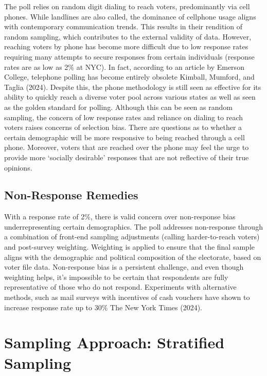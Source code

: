\documentclass[
  letterpaper,
  DIV=11,
  numbers=noendperiod]{scrartcl}
\begin{document}
The poll relies on random digit dialing to reach voters, predominantly
via cell phones. While landlines are also called, the dominance of
cellphone usage aligns with contemporary communication trends. This
results in their rendition of random sampling, which contributes to the
external validity of data. However, reaching voters by phone has become
more difficult due to low response rates requiring many attempts to
secure responses from certain individuals (response rates are as low as
2\% at NYC). In fact, according to an article by Emerson College,
telephone polling has become entirely obsolete Kimball, Mumford, and
Taglia (2024). Despite this, the phone methodology is still seen as
effective for its ability to quickly reach a diverse voter pool across
various states as well as seen as the golden standard for polling.
Although this can be seen as random sampling, the concern of low
response rates and reliance on dialing to reach voters raises concerns
of selection bias. There are questions as to whether a certain
demographic will be more responsive to being reached through a cell
phone. Moreover, voters that are reached over the phone may feel the
urge to provide more `socially desirable' responses that are not
reflective of their true opinions.

\hypertarget{non-response-remedies}{%
\subsection{Non-Response Remedies}\label{non-response-remedies}}

With a response rate of 2\%, there is valid concern over non-response
bias underrepresenting certain demographics. The poll addresses
non-response through a combination of front-end sampling adjustments
(calling harder-to-reach voters) and post-survey weighting. Weighting is
applied to ensure that the final sample aligns with the demographic and
political composition of the electorate, based on voter file data.
Non-response bias is a persistent challenge, and even though weighting
helps, it's impossible to be certain that respondents are fully
representative of those who do not respond. Experiments with alternative
methods, such as mail surveys with incentives of cash vouchers have
shown to increase response rate up to 30\% The New York Times (2024).

\hypertarget{sampling-approach-stratified-sampling}{%
\section{Sampling Approach: Stratified
Sampling}\label{sampling-approach-stratified-sampling}}
\end{document}
